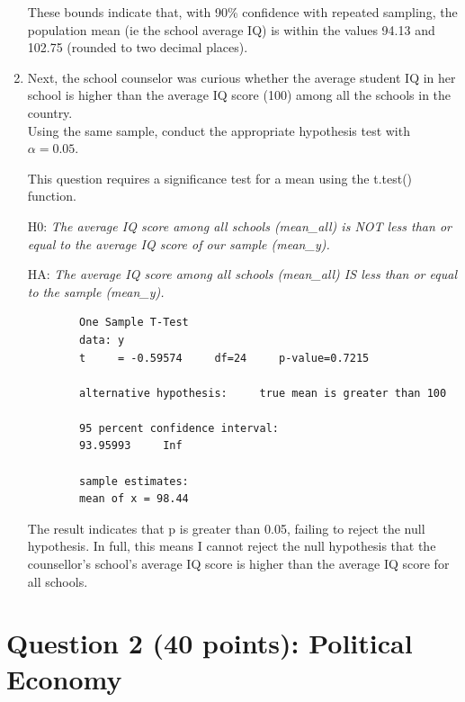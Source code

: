 \documentclass[12pt,letterpaper]{article}
\begin{document}
\begin{enumerate}
	
	
	\noindent These bounds indicate that, with 90\% confidence with repeated sampling, the population mean (ie the school average IQ) is within the values 94.13 and 102.75 (rounded to two decimal places). 
	
	\item Next, the school counselor was curious  whether  the average student IQ in her school is higher than the average IQ score (100) among all the schools in the country.\\ 
	
	\noindent Using the same sample, conduct the appropriate hypothesis test with $\alpha=0.05$.
	\vspace{.5cm}
	
	\noindent This question requires a significance test for a mean using the t.test() function.
	\vspace{.5cm}
	
	\indent H0: \textit{The average IQ score among all schools (mean\_all) is NOT less than or equal to the average IQ score of our sample (mean\_y).}
	
	HA: \textit{The average IQ score among all schools (mean\_all) IS less than or equal to the sample (mean\_y).}
	\vspace{.5cm}
	
	
		
	\begin{verbatim}
		One Sample T-Test
		data: y
		t     = -0.59574     df=24     p-value=0.7215
		
		alternative hypothesis:     true mean is greater than 100
		
		95 percent confidence interval:
		93.95993     Inf
		
		sample estimates:
		mean of x = 98.44
	\end{verbatim}
	
	\noindent The result indicates that p is greater than 0.05, failing to reject the null hypothesis. In full, this means I cannot reject the null hypothesis that the counsellor's school's average IQ score is higher than the average IQ score for all schools.
	
\end{enumerate}

\newpage

	\section*{Question 2 (40 points): Political Economy}
\end{document}
